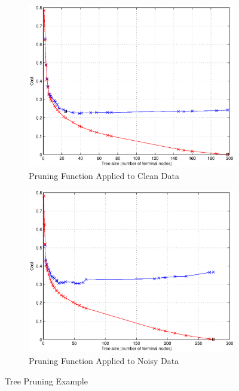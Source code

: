 \documentclass[10pt,a4paper]{article}
\begin{document}
\begin{figure}[!ht]
	\centering
	\begin{subfigure}[b]{0.495\textwidth}
		\includegraphics[width=\textwidth]{images/pruning_clean_data.eps}
     	\caption{Pruning Function Applied to Clean Data}
     	\label{fig:pruningClean}
    \end{subfigure}
	\begin{subfigure}[b]{0.495\textwidth}
		\includegraphics[width=\textwidth]{images/pruning_noisy_data.eps}
     	\caption{Pruning Function Applied to Noisy Data}
     	\label{fig:pruningNoisy}
    \end{subfigure}
    \caption{Tree Pruning Example}
    \label{fig:pruning}
\end{figure}
\end{document}
